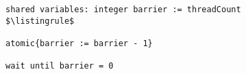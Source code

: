 \begin{lstlisting}[mathescape]
shared variables: integer barrier := threadCount
$\listingrule$

atomic{barrier := barrier - 1}

wait until barrier = 0
\end{lstlisting}
